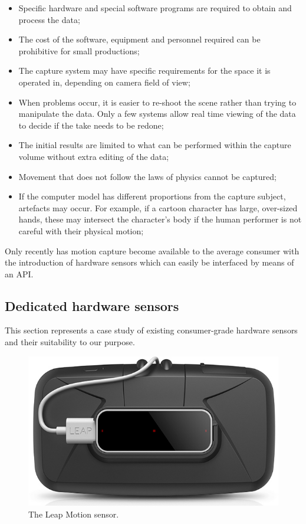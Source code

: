 \documentclass[a4paper, 12pt]{amsart}
\begin{document}
\begin{itemize}
\item Specific hardware and special software programs are required to obtain and process the data;
\item The cost of the software, equipment and personnel required can be prohibitive for small productions;
\item The capture system may have specific requirements for the space it is operated in, depending on camera field of view;
\item When problems occur, it is easier to re-shoot the scene rather than trying to manipulate the data. Only a few systems allow real time viewing of the data to decide if the take needs to be redone;
\item The initial results are limited to what can be performed within the capture volume without extra editing of the data;
\item Movement that does not follow the laws of physics cannot be captured;
\item If the computer model has different proportions from the capture subject, artefacts may occur. For example, if a cartoon character has large, over-sized hands, these may intersect the character's body if the human performer is not careful with their physical motion;
\end{itemize}

Only recently has motion capture become available to the average consumer with the introduction of hardware sensors which can easily be interfaced by means of an API.

\subsection{Dedicated hardware sensors}

This section represents a case study of existing consumer-grade hardware sensors and their suitability to our purpose.

\begin{figure}[htb]
\centering
\includegraphics[width=.9\linewidth]{fig_leap_motion}
\caption{The Leap Motion sensor.}
\label{fig:leap_motion}
\end{figure}
\end{document}
